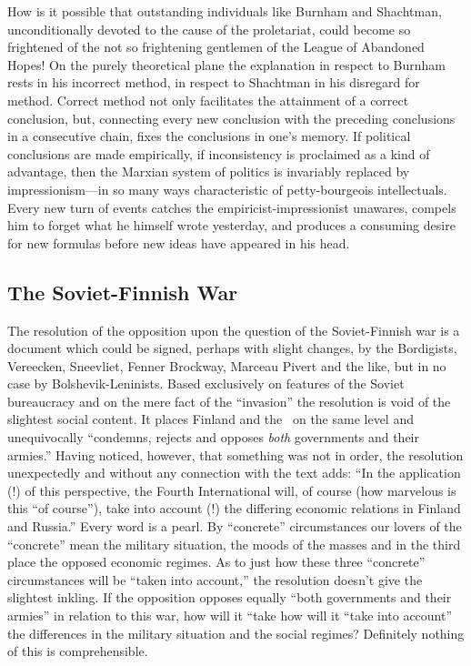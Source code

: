 How is it possible that outstanding individuals like Burnham and Shachtman, unconditionally devoted to the cause of the proletariat, could become so frightened of the not so frightening gentlemen of the League of Abandoned Hopes! On the purely theoretical plane the explanation in respect to Burnham rests in his incorrect method, in respect to Shachtman in his disregard for method. Correct method not only facilitates the attainment of a correct conclusion, but, connecting every new conclusion with the preceding conclusions in a consecutive chain, fixes the conclusions in one’s memory. If political conclusions are made empirically, if inconsistency is proclaimed as a kind of advantage, then the Marxian system of politics is invariably replaced by impressionism---in so many ways characteristic of petty-bourgeois intellectuals. Every new turn of events catches the empiricist-impressionist unawares, compels him to forget what he himself wrote yesterday, and produces a consuming desire for new formulas before new ideas have appeared in his head.

\subsection*{The Soviet-Finnish War}

The resolution of the opposition upon the question of the Soviet-Finnish war is a document which could be signed, perhaps with slight changes, by the Bordigists, Vereecken, Sneevliet, Fenner Brockway, Marceau Pivert and the like, but in no case by Bolshevik-Leninists. Based exclusively on features of the Soviet bureaucracy and on the mere fact of the “invasion” the resolution is void of the slightest social content. It places Finland and the \USSR\ on the same level and unequivocally “condemns, rejects and opposes \emph{both} governments and their armies.” Having noticed, however, that something was not in order, the resolution unexpectedly and without any connection with the text adds: “In the application (!) of this perspective, the Fourth International will, of course (how marvelous is this “of course”), take into account (!) the differing economic relations in Finland and Russia.” Every word is a pearl. By “concrete” circumstances our lovers of the “concrete” mean the military situation, the moods of the masses and in the third place the opposed economic regimes. As to just how these three “concrete” circumstances will be “taken into account,” the resolution doesn’t give the slightest inkling. If the opposition opposes equally “both governments and their armies” in relation to this war, how will it “take how will it “take into account” the differences in the military situation and the social regimes? Definitely nothing of this is comprehensible.

